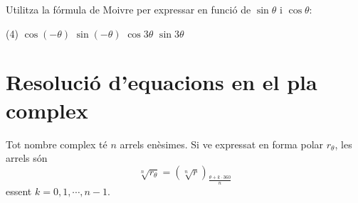 	\begin{mylist}
		
	
	\exer Utilitza la fórmula de Moivre per expressar en funció de $\sin \theta$ i $\cos \theta$:
	\begin{tasks}(4)
		\task $\cos (-\theta)$
		\task $\sin (-\theta)$
		\task $\cos 3\theta$
		\task $\sin 3\theta$	
\end{tasks}
\answers[cols=1]{[$\cos (-\theta)=\cos \theta$, $\sin (-\theta)=-\sin\theta$, $\cos 3\theta=\cos^3 \theta - 3\sin^2 \theta \cos \theta$, $\sin 3\theta=3\sin \theta\cos^2 \theta - \sin^3\theta$]}

\end{mylist}

 
\section{Resolució d'equacions en el pla complex}
\begin{theorybox}
			Tot nombre complex té $n$ arrels enèsimes. Si ve expressat en forma polar $r_\theta$, les arrels són
	\begin{equation*}
		\sqrt[n]{r_\theta}= \left(\sqrt[n]{r}\right)_{\frac{\theta+k\cdot 360}{n}}
	\end{equation*}
	essent $k=0, 1, \cdots, n-1$.
	
	\vspace{0.5cm}

\end{theorybox}
	
